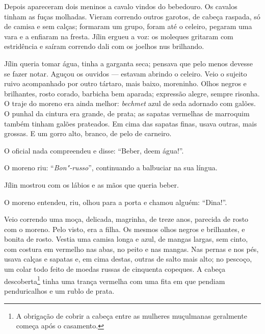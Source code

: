 Depois apareceram dois meninos a cavalo vindos do bebedouro. Os cavalos
tinham as fuças molhadas. Vieram correndo outros garotos, de cabeça
raspada, só de camisa e sem calças; formaram um grupo, foram até o
celeiro, pegaram uma vara e a enfiaram na fresta. Jílin ergueu a voz: os
moleques gritaram com estridência e saíram correndo dali com os joelhos
nus brilhando.

Jílin queria tomar água, tinha a garganta seca; pensava que pelo menos
devesse se fazer notar. Aguçou os ouvidos --- estavam abrindo o celeiro.
Veio o sujeito ruivo acompanhado por outro tártaro, mais baixo,
moreninho. Olhos negros e brilhantes, rosto corado, barbicha bem
aparada; expressão alegre, sempre risonha. O traje do moreno era ainda
melhor: \emph{bechmet} azul de seda adornado com galões. O punhal da
cintura era grande, de prata; as sapatas vermelhas de marroquim também
tinham galões prateados. Em cima das sapatas finas, usava outras,
mais grossas. E um gorro alto, branco, de pelo de carneiro.


O oficial nada compreendeu e disse: ``Beber, deem água!''.

O moreno riu: ``\emph{Bon"-russo}'', continuando a balbuciar na sua
língua.

Jílin mostrou com os lábios e as mãos que queria beber.

O moreno entendeu, riu, olhou para a porta e chamou alguém: ``Dina!''.

Veio correndo uma moça, delicada, magrinha, de treze anos, parecida de
rosto com o moreno. Pelo visto, era a filha. Os mesmos olhos negros e
brilhantes, e bonita de rosto. Vestia uma camisa longa e azul, de mangas
largas, sem cinto, com costura em vermelho nas abas, no peito e nas
mangas. Nas pernas e nos pés, usava calças e sapatas e, em cima destas,
outras de salto mais alto; no pescoço, um colar todo feito de
moedas russas de cinquenta copeques. A cabeça descoberta\footnote{A
  obrigação de cobrir a cabeça entre as mulheres muçulmanas geralmente
  começa após o casamento.} tinha uma trança vermelha com uma fita em
que pendiam penduricalhos e um rublo de prata.

